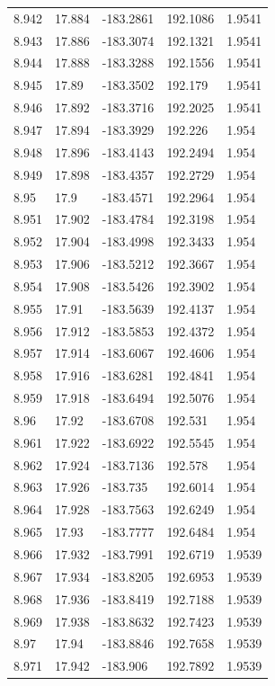 \begin{tabular}{lllll}
8.942 & 17.884 & -183.2861 & 192.1086 & 1.9541 \\
8.943 & 17.886 & -183.3074 & 192.1321 & 1.9541 \\
8.944 & 17.888 & -183.3288 & 192.1556 & 1.9541 \\
8.945 & 17.89 & -183.3502 & 192.179 & 1.9541 \\
8.946 & 17.892 & -183.3716 & 192.2025 & 1.9541 \\
8.947 & 17.894 & -183.3929 & 192.226 & 1.954 \\
8.948 & 17.896 & -183.4143 & 192.2494 & 1.954 \\
8.949 & 17.898 & -183.4357 & 192.2729 & 1.954 \\
8.95 & 17.9 & -183.4571 & 192.2964 & 1.954 \\
8.951 & 17.902 & -183.4784 & 192.3198 & 1.954 \\
8.952 & 17.904 & -183.4998 & 192.3433 & 1.954 \\
8.953 & 17.906 & -183.5212 & 192.3667 & 1.954 \\
8.954 & 17.908 & -183.5426 & 192.3902 & 1.954 \\
8.955 & 17.91 & -183.5639 & 192.4137 & 1.954 \\
8.956 & 17.912 & -183.5853 & 192.4372 & 1.954 \\
8.957 & 17.914 & -183.6067 & 192.4606 & 1.954 \\
8.958 & 17.916 & -183.6281 & 192.4841 & 1.954 \\
8.959 & 17.918 & -183.6494 & 192.5076 & 1.954 \\
8.96 & 17.92 & -183.6708 & 192.531 & 1.954 \\
8.961 & 17.922 & -183.6922 & 192.5545 & 1.954 \\
8.962 & 17.924 & -183.7136 & 192.578 & 1.954 \\
8.963 & 17.926 & -183.735 & 192.6014 & 1.954 \\
8.964 & 17.928 & -183.7563 & 192.6249 & 1.954 \\
8.965 & 17.93 & -183.7777 & 192.6484 & 1.954 \\
8.966 & 17.932 & -183.7991 & 192.6719 & 1.9539 \\
8.967 & 17.934 & -183.8205 & 192.6953 & 1.9539 \\
8.968 & 17.936 & -183.8419 & 192.7188 & 1.9539 \\
8.969 & 17.938 & -183.8632 & 192.7423 & 1.9539 \\
8.97 & 17.94 & -183.8846 & 192.7658 & 1.9539 \\
8.971 & 17.942 & -183.906 & 192.7892 & 1.9539 \\

\end{tabular}
